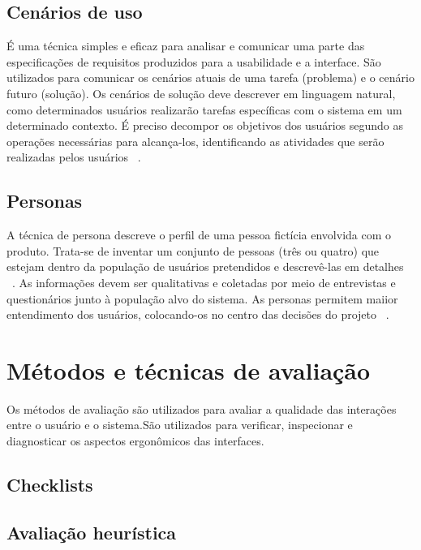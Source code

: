 \subsection{Cenários de uso}

	É uma técnica simples e eficaz para analisar e comunicar uma parte das especificações de requisitos produzidos para a usabilidade e a interface. São utilizados para comunicar os cenários atuais de uma tarefa (problema) e o cenário futuro (solução). Os cenários de solução deve descrever em linguagem natural, como determinados usuários realizarão tarefas específicas com o sistema em um determinado contexto. É preciso decompor os objetivos dos usuários segundo as operações necessárias para alcança-los, identificando as atividades que serão realizadas pelos usuários ~\cite{cybis2010}.

\subsection{Personas}

	A técnica de persona descreve o perfil de uma pessoa fictícia envolvida com o produto. Trata-se de inventar um conjunto de pessoas (três ou quatro) que estejam dentro da população de usuários pretendidos e descrevê-las em detalhes ~\cite{cybis2010}.
	As informações devem ser qualitativas e coletadas por meio de entrevistas e questionários junto à população alvo do sistema. As personas permitem maiior entendimento dos usuários, colocando-os no centro das decisões do projeto ~\cite{cybis2010}.


\section{Métodos e técnicas de avaliação}

	Os métodos de avaliação são utilizados para avaliar a qualidade das interações entre o usuário e o sistema.São utilizados para verificar, inspecionar e diagnosticar os aspectos ergonômicos das interfaces.

\subsection{Checklists}

\subsection{Avaliação heurística}

